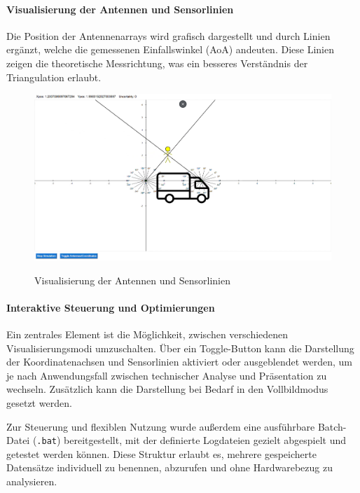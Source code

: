 \documentclass[a4paper, 12pt]{article} %
\begin{document}
\paragraph{Visualisierung der Antennen und Sensorlinien}

Die Position der Antennenarrays wird grafisch dargestellt und durch Linien ergänzt, welche die gemessenen Einfallswinkel (\ac{AoA}) andeuten. Diese Linien 
zeigen die theoretische Messrichtung, was ein besseres Verständnis der Triangulation erlaubt.

\begin{figure}[H]
    \includegraphics[width=1\linewidth]{images/Visualisierung Antennen.png}\\[1ex]
    \centering
    \caption{Visualisierung der Antennen und Sensorlinien}
    \label{ABBILDUNG}
\end{figure}

\paragraph{Interaktive Steuerung und Optimierungen}

Ein zentrales Element ist die Möglichkeit, zwischen verschiedenen Visualisierungsmodi umzuschalten. Über ein Toggle-Button kann die Darstellung der 
Koordinatenachsen und Sensorlinien aktiviert oder ausgeblendet werden, um je nach Anwendungsfall zwischen technischer Analyse und Präsentation zu 
wechseln. Zusätzlich kann die Darstellung bei Bedarf in den Vollbildmodus gesetzt werden.

Zur Steuerung und flexiblen Nutzung wurde außerdem eine ausführbare Batch-Datei (\texttt{.bat}) bereitgestellt, mit der definierte Logdateien gezielt 
abgespielt und getestet werden können. Diese Struktur erlaubt es, mehrere gespeicherte Datensätze individuell zu benennen, abzurufen und ohne 
Hardwarebezug zu analysieren.
\end{document}
